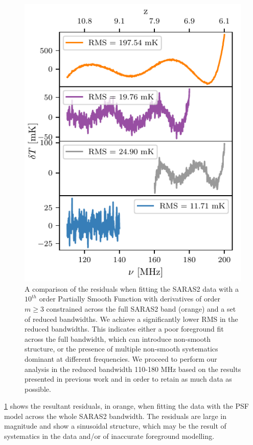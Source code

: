 \begin{figure}
    \centering
    \includegraphics{saras2/figs/bandwidth.pdf}
    \caption{A comparison of the residuals when fitting the SARAS2 data with a $10^{th}$ order Partially Smooth Function with derivatives of order $m \geqslant 3$ constrained across the full SARAS2 band (orange) and a set of reduced bandwidths. We achieve a significantly lower RMS in the reduced bandwidths. This indicates either a poor foreground fit across the full bandwidth, which can introduce non-smooth structure, or the presence of multiple non-smooth systematics dominant at different frequencies. We proceed to perform our analysis in the reduced bandwidth 110-180 MHz based on the results presented in previous work \protect\citep{Singh_saras2_2017,SARAS2_radiometer_2018} and in order to retain as much data as possible.}
    \label{fig:foreground_res}
\end{figure}

\cref{fig:foreground_res} shows the resultant residuals, in orange, when fitting the data with the PSF model across the whole SARAS2 bandwidth. The residuals are large in magnitude and show a sinusoidal structure, which may be the result of systematics in the data and/or of inaccurate foreground modelling. 


